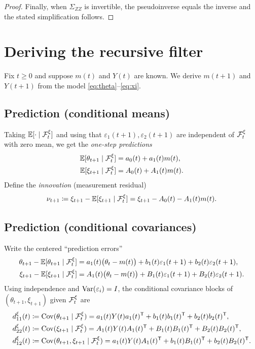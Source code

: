 \begin{proof}
\medskip
Finally, when $\Sigma_{ZZ}$ is invertible, the pseudoinverse equals the inverse and the stated simplification follows.
\end{proof}





\section{Deriving the recursive filter}

Fix \(t\ge 0\) and suppose \(m(t)\) and \(Y(t)\) are known.
We derive \(m(t+1)\) and \(Y(t+1)\) from the model \eqref{eq:theta}--\eqref{eq:xi}.

\subsection{Prediction (conditional means)}
Taking \(\mathbb{E}[\cdot\mid \mathcal{F}_t^\xi]\) and using that \(\varepsilon_1(t+1),\varepsilon_2(t+1)\) are independent of \(\mathcal{F}_t^\xi\)
with zero mean, we get the \emph{one-step predictions}
\begin{align}
\mathbb{E}[\theta_{t+1}\mid \mathcal{F}_t^\xi] &= a_0(t) + a_1(t)m(t), \label{eq:predtheta}\\
\mathbb{E}[\xi_{t+1}\mid \mathcal{F}_t^\xi] &= A_0(t) + A_1(t)m(t). \label{eq:predxi}
\end{align}
Define the \emph{innovation} (measurement residual)
\[
\nu_{t+1}\coloneqq \xi_{t+1}-\mathbb{E}[\xi_{t+1}\mid \mathcal{F}_t^\xi]
= \xi_{t+1}-A_0(t)-A_1(t)m(t).
\]

\subsection{Prediction (conditional covariances)}
Write the centered ``prediction errors''
\begin{align*}
\theta_{t+1}-\mathbb{E}[\theta_{t+1}\mid \mathcal{F}_t^\xi]
&= a_1(t)\bigl(\theta_t-m(t)\bigr)
  + b_1(t)\varepsilon_1(t+1)+b_2(t)\varepsilon_2(t+1),\\
\xi_{t+1}-\mathbb{E}[\xi_{t+1}\mid \mathcal{F}_t^\xi]
&= A_1(t)\bigl(\theta_t-m(t)\bigr)
  + B_1(t)\varepsilon_1(t+1)+B_2(t)\varepsilon_2(t+1).
\end{align*}
Using independence and \(\mathrm{Var}(\varepsilon_i)=I\), the conditional covariance blocks of
\((\theta_{t+1},\xi_{t+1})\) given \(\mathcal{F}_t^\xi\) are
\begin{align}
d_{11}^\xi(t) &\coloneqq \mathrm{Cov}(\theta_{t+1}\mid \mathcal{F}_t^\xi)
= a_1(t)Y(t)a_1(t)^{\mathsf{T}} + b_1(t)b_1(t)^{\mathsf{T}} + b_2(t)b_2(t)^{\mathsf{T}},\label{eq:d11}\\
d_{22}^\xi(t) &\coloneqq \mathrm{Cov}(\xi_{t+1}\mid \mathcal{F}_t^\xi)
= A_1(t)Y(t)A_1(t)^{\mathsf{T}} + B_1(t)B_1(t)^{\mathsf{T}} + B_2(t)B_2(t)^{\mathsf{T}},\label{eq:d22}\\
d_{12}^\xi(t) &\coloneqq \mathrm{Cov}(\theta_{t+1},\xi_{t+1}\mid \mathcal{F}_t^\xi)
= a_1(t)Y(t)A_1(t)^{\mathsf{T}} + b_1(t)B_1(t)^{\mathsf{T}} + b_2(t)B_2(t)^{\mathsf{T}}.\label{eq:d12}
\end{align}

